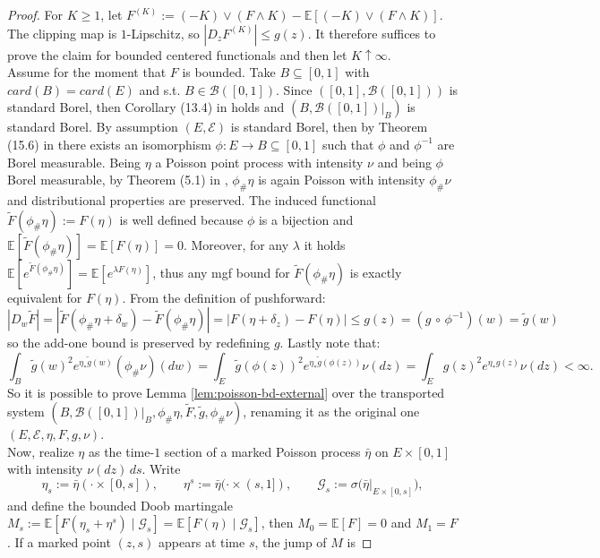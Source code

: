 \documentclass{article}
\newcommand{\E}{\mathbb{E}}
\begin{document}
\begin{proof}
For $K\ge 1$, let $F^{(K)}:=(-K)\vee(F\wedge K)-\mathbb E[(-K)\vee(F\wedge K)]$.
The clipping map is $1$-Lipschitz, so $|D_zF^{(K)}|\le g(z)$. It therefore suffices to prove the claim for bounded centered functionals and then let $K\uparrow\infty$. \\
Assume for the moment that $F$ is bounded. Take $B\subseteq[0,1]$ with $card(B)=card (E)$ and s.t. $B\in \mathcal B([0,1])$. Since $([0,1],\mathcal B([0,1]))$ is standard Borel, then Corollary (13.4) in \cite{kechris2012classical} holds and $(B, \mathcal B([0,1])|_{B})$ is standard Borel. By assumption $(E,\mathcal E)$ is standard Borel, then by Theorem (15.6) in \cite{kechris2012classical} there exists an isomorphism $\phi:E\to B\subseteq [0,1]$ such that $\phi$ and $\phi^{-1}$ are Borel measurable. Being $\eta$ a Poisson point process with intensity $\nu$ and being $\phi$ Borel measurable, by Theorem (5.1) in \cite{last2018lectures}, $\phi_{\#}\eta$ is again Poisson with intensity $\phi_{\#}\nu$ and distributional properties are preserved. 
The induced functional $\widetilde F(\phi_\#\eta):=F(\eta)$ is well defined because $\phi$ is a bijection and $\E[\tilde F (\phi_{\#}\eta)]=\E[F(\eta)]=0$. Moreover, for any $\lambda$ it holds $\E[e^{\tilde F(\phi_{\#}\eta)}]=\E[e^{\lambda F(\eta)}]$, thus any mgf bound for $\tilde F(\phi_{\#}\eta)$ is exactly equivalent for $F(\eta)$. From the definition of pushforward:
\[
|D_w\tilde F| = |\tilde F(\phi_{\#}\eta+\delta_w)-\tilde F(\phi_{\#}\eta)| = |F(\eta+\delta_z)-F(\eta)|\le g(z)=(g \,\circ\,\phi^{-1})(w)=\tilde g(w)
\]
so the add-one bound is preserved by redefining $g$. Lastly note that:
\[
\int_B \tilde g(w)^2e^{\eta_*\tilde g(w)} (\phi_{\#}\nu)(dw) = \int_E \tilde g(\phi(z))^2 e^{\eta_*\tilde g(\phi(z))} \nu(dz) = \int_E g(z)^2 e^{\eta_* g(z)} \nu(dz)  <\infty .
\]
So it is possible to prove Lemma \ref{lem:poisson-bd-external} over the transported system $(B, \mathcal B([0,1])|_B, \phi_{\#}\eta,\tilde F, \tilde g, \phi_{\#}\nu)$, renaming it as the original one $(E,\mathcal E, \eta, F, g,\nu)$. \\
Now, realize $\eta$ as the time-$1$ section of a marked Poisson process $\bar\eta$ on $E\times[0,1]$ with intensity $\nu(dz)\,ds$. Write
\[
\eta_s:=\bar\eta(\cdot\times[0,s]),
\qquad
\eta^s:=\bar\eta(\cdot\times(s,1]),
\qquad
\mathcal G_s:=\sigma\!\bigl(\bar\eta|_{E\times[0,s]}\bigr),
\]
and define the bounded Doob martingale $M_s:=\E[F(\eta_s+\eta^s)\mid \mathcal G_s]=\E[F(\eta)\mid \mathcal G_s]$, then $M_0=\E[F]=0$ and $M_1=F$. If a marked point $(z,s)$ appears at time $s$, the jump of $M$ is

\end{proof}
\end{document}
